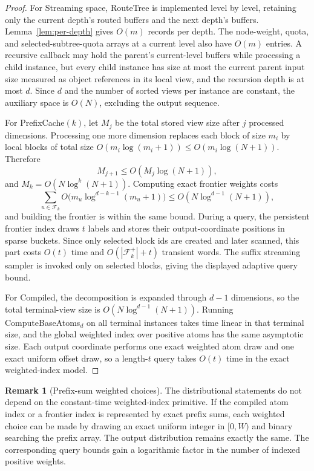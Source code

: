 \documentclass[11pt]{article}
\theoremstyle{definition}
\newtheorem{remark}[theorem]{Remark}
\begin{document}
\begin{proof}
For Streaming space, RouteTree is implemented level by level, retaining only the current depth's routed buffers and the next depth's buffers.  Lemma~\ref{lem:per-depth} gives $O(m)$ records per depth.  The node-weight, quota, and selected-subtree-quota arrays at a current level also have $O(m)$ entries.  A recursive callback may hold the parent's current-level buffers while processing a child instance, but every child instance has size at most the current parent input size measured as object references in its local view, and the recursion depth is at most $d$.  Since $d$ and the number of sorted views per instance are constant, the auxiliary space is $O(N)$, excluding the output sequence.

For PrefixCache$(k)$, let $M_j$ be the total stored view size after $j$ processed dimensions.  Processing one more dimension replaces each block of size $m_i$ by local blocks of total size $O(m_i\log(m_i+1))\le O(m_i\log(N+1))$.  Therefore
\[
  M_{j+1}\le O(M_j\log(N+1)),
\]
and $M_k=O(N\log^k(N+1))$.  Computing exact frontier weights costs
\[
  \sum_{u\in\mathcal F_k}O\bigl(m_u\log^{d-k-1}(m_u+1)\bigr)
  \le O(N\log^{d-1}(N+1)),
\]
and building the frontier is within the same bound.  During a query, the persistent frontier index draws $t$ labels and stores their output-coordinate positions in sparse buckets.  Since only selected block ids are created and later scanned, this part costs $O(t)$ time and $O(|\mathcal F_k^+|+t)$ transient words.  The suffix streaming sampler is invoked only on selected blocks, giving the displayed adaptive query bound.

For Compiled, the decomposition is expanded through $d-1$ dimensions, so the total terminal-view size is $O(N\log^{d-1}(N+1))$.  Running ComputeBaseAtoms$_d$ on all terminal instances takes time linear in that terminal size, and the global weighted index over positive atoms has the same asymptotic size.  Each output coordinate performs one exact weighted atom draw and one exact uniform offset draw, so a length-$t$ query takes $O(t)$ time in the exact weighted-index model.
\end{proof}

\begin{remark}[Prefix-sum weighted choices]
The distributional statements do not depend on the constant-time weighted-index primitive.  If the compiled atom index or a frontier index is represented by exact prefix sums, each weighted choice can be made by drawing an exact uniform integer in $[0,W)$ and binary searching the prefix array.  The output distribution remains exactly the same.  The corresponding query bounds gain a logarithmic factor in the number of indexed positive weights.
\end{remark}
\end{document}
